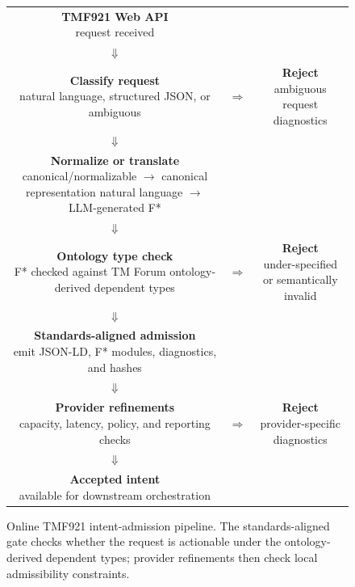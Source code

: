 \documentclass[conference]{IEEEtran}
\begin{document}
\begin{figure}[t]
\centering
\begingroup
\footnotesize
\setlength{\fboxsep}{4pt}
\renewcommand{\arraystretch}{1.15}
\newcommand{\admissionflowbox}[2]{\fbox{\begin{minipage}{#1}\centering #2\end{minipage}}}
\newcommand{\admissionmainbox}[1]{\admissionflowbox{0.57\linewidth}{#1}}
\newcommand{\admissionsidebox}[1]{\admissionflowbox{0.27\linewidth}{#1}}
\begin{tabular}{@{}c@{\hspace{0.35em}}c@{\hspace{0.35em}}c@{}}
\admissionmainbox{\textbf{TMF921 Web API}\\request received} & & \\
$\Downarrow$ & & \\
\admissionmainbox{\textbf{Classify request}\\natural language, structured JSON, or ambiguous}
& $\Rightarrow$ &
\admissionsidebox{\textbf{Reject}\\ambiguous request diagnostics} \\
$\Downarrow$ & & \\
\admissionmainbox{\textbf{Normalize or translate}\\canonical/normalizable $\rightarrow$ canonical representation\\natural language $\rightarrow$ LLM-generated F*}
& & \\
$\Downarrow$ & & \\
\admissionmainbox{\textbf{Ontology type check}\\F* checked against TM Forum ontology-derived dependent types}
& $\Rightarrow$ &
\admissionsidebox{\textbf{Reject}\\under-specified or semantically invalid} \\
$\Downarrow$ & & \\
\admissionmainbox{\textbf{Standards-aligned admission}\\emit JSON-LD, F* modules, diagnostics, and hashes}
& & \\
$\Downarrow$ & & \\
\admissionmainbox{\textbf{Provider refinements}\\capacity, latency, policy, and reporting checks}
& $\Rightarrow$ &
\admissionsidebox{\textbf{Reject}\\provider-specific diagnostics} \\
$\Downarrow$ & & \\
\admissionmainbox{\textbf{Accepted intent}\\available for downstream orchestration} & &
\end{tabular}
\endgroup
\caption{Online TMF921 intent-admission pipeline. The standards-aligned gate checks whether the request is actionable under the ontology-derived dependent types; provider refinements then check local admissibility constraints.}
\label{fig:processing-pipeline}
\end{figure}
\end{document}
